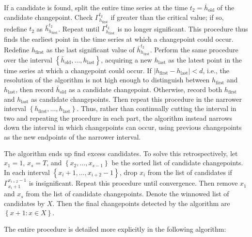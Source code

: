 \documentclass[conference,letterpaper]{IEEEtran}
\newcommand\set[1]{\left\{ #1 \right\}}
\newcommand\abs[1]{\left| #1 \right|}
\newcommand\hfirst{{h_{\mathrm{first}}}}
\newcommand\hlast{{h_{\mathrm{last}}}}
\begin{document}
If a candidate is found, split the entire time series at the time $t_2=\bar h_{\mathrm{old}}$ of the candidate changepoint. Check $\Gamma_\hfirst^{t_2}$ if greater than the critical value; if so, redefine $t_2$ as $\bar h_\hfirst^{t_2}$. Repeat until $\Gamma_\hfirst^{t_2}$ is no longer significant. This procedure thus finds the earliest point in the time series at which a changepoint could occur. Redefine $\hfirst$ as the last significant value of $\bar h_\hfirst^{t_2}$. Perform the same procedure over the interval $\set{\bar h_{\mathrm{old}},\ldots,\hlast}$, acquiring a new $\hlast$ as the latest point in the time series at which a changepoint could occur. If $\abs{\hfirst-\hlast}<d$, i.e., the resolution of the algorithm is not high enough to distinguish between $\hfirst$ and $\hlast$, then record $\bar h_{\mathrm{old}}$ as a candidate changepoint. Otherwise, record both $\hfirst$ and $\hlast$ as candidate changepoints. Then repeat this procedure in the narrower interval $\set{\hfirst,\ldots,\hlast}$. Thus, rather than continually cutting the interval in two and repeating the procedure in each part, the algorithm instead narrows down the interval in which changepoints can occur, using previous changepoints as the new endpoints of the narrower interval.

The algorithm ends up find excess candidates. To solve this retrospectively, let $x_1=1$, $x_s=T$, and $\set{x_2,\ldots,x_{s-1}}$ be the sorted list of candidate changepoints. In each interval $\set{x_i+1,\ldots,x_{i+2}-1}$, drop $x_i$ from the list of candidates if $\Gamma_{x_i+1}^{x_{i+2}-1}$ is insignificant. Repeat this procedure until convergence. Then remove $x_1$ and $x_s$ from the list of candidate changepoints. Denote the winnowed list of candidates by $X$. Then the final changepoints detected by the algorithm are $\set{x+1:x\in X}$.

The entire procedure is detailed more explicitly in the following algorithm:
\end{document}
